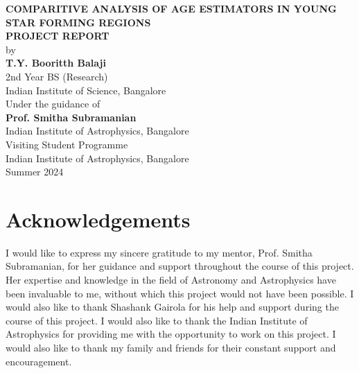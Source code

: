 \documentclass[12pt]{report}
\begin{document}
\begin{titlepage}

    \begin{center}
    
    \renewcommand{\baselinestretch}{1.5}
    \Large \textbf {COMPARITIVE ANALYSIS OF AGE ESTIMATORS IN YOUNG STAR FORMING REGIONS}\\[0.6in]
    
    
    \normalsize
    \textbf{PROJECT REPORT}\\[0.4in]
    
     by \\[0.1in]
    \normalsize
    \textbf{T.Y. Booritth Balaji}\\[0.1in]
    \small
    2nd Year BS (Research)\\
    Indian Institute of Science, Bangalore\\[0.1in]
    
    
    
    
    \vspace{.3in}
    Under the guidance of\\[0.1in]
    \normalsize
    {\textbf{Prof. Smitha Subramanian}}\\
    \small
    Indian Institute of Astrophysics, Bangalore\\
    
    \vfill
    Visiting Student Programme\\
    Indian Institute of Astrophysics, Bangalore\\
    Summer 2024\\
    
    
    \end{center}
    
    \end{titlepage}
\newpage

\chapter*{Acknowledgements} 
\normalsize
I would like to express my sincere gratitude to my mentor, Prof. Smitha Subramanian, for her guidance and support throughout the course of this project. Her expertise and knowledge in the field of Astronomy and Astrophysics have been invaluable to me, without which this project would not have been possible. 
I would also like to thank Shashank Gairola for his help and support during the course of this project. I would also like to thank the Indian Institute of Astrophysics for providing me with the opportunity to work on this project. I would also like to thank my family and friends for their constant support and encouragement.
\end{document}
